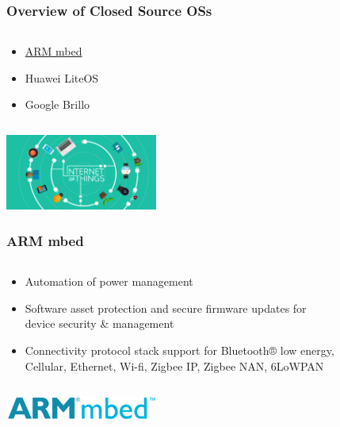 \documentclass{beamer}
\begin{document}
\begin{frame}
	\frametitle{Overview of Closed Source OSs}
	\begin{columns}[c]
		\begin{column}{30cm}
			\vspace{.1cm}
			\begin{itemize}
				\justifying
				\item \textcolor{blue}{\href{https://mbed.org/}{ARM mbed}}
				\item Huawei LiteOS
				\item Google Brillo
			\end{itemize}
		\end{column}
	\end{columns}
	\vspace{.5cm}
	\hspace*{5.5cm} \includegraphics[width=5cm]{figs/Internet-of-Things-2.jpg}
\end{frame}

\begin{frame}
	\frametitle{ARM mbed}
	\begin{columns}[c]
		\begin{column}{30cm}
			\vspace{.1cm}
			\begin{itemize}
				\justifying
				\item Automation of power management
				\item Software asset protection and secure firmware updates for\\
				device security \& management
				\item Connectivity protocol stack support for Bluetooth® low energy,\\
				Cellular, Ethernet, Wi-fi, Zigbee IP, Zigbee NAN, 6LoWPAN
			\end{itemize}
		\end{column}
	\end{columns}
	\vspace{.5cm}
	\hspace*{5.5cm} \includegraphics[width=5cm]{figs/ARM-mbed-logo.png}
\end{frame}
\end{document}
